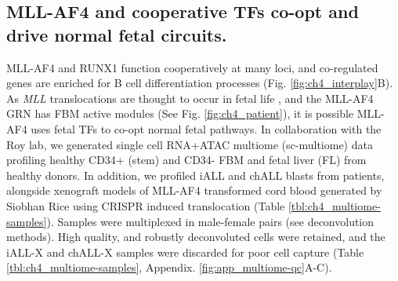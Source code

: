 \subsection{MLL-AF4 and cooperative TFs co-opt and drive normal fetal circuits.}

MLL-AF4 and RUNX1 function cooperatively at many loci, and co-regulated genes are enriched for B cell differentiation processes (Fig. \ref{fig:ch4_interplay}B). As \textit{MLL} translocations are thought to occur in fetal life \citep{greaves_causal_2018, greaves_utero_2005, ford_utero_1993, jackson_origin_2021}, and the MLL-AF4 GRN has FBM active modules (See Fig. \ref{fig:ch4_patient}), it is possible MLL-AF4 uses fetal TFs to co-opt normal fetal pathways. In collaboration with the Roy lab, we generated single cell RNA+ATAC multiome (sc-multiome) data profiling healthy CD34+ (stem) and CD34- FBM and fetal liver (FL) from healthy donors. In addition, we profiled iALL and chALL blasts from patients, alongside xenograft models of MLL-AF4 transformed cord blood generated by Siobhan Rice using CRISPR induced translocation \citep{rice_human_2021} (Table \ref{tbl:ch4_multiome-samples}). Samples were multiplexed in male-female pairs (see deconvolution methods). High quality, and robustly deconvoluted cells were retained, and the iALL-X and chALL-X samples were discarded for poor cell capture (Table \ref{tbl:ch4_multiome-samples}, Appendix. \ref{fig:app_multiome-qc}A-C).

